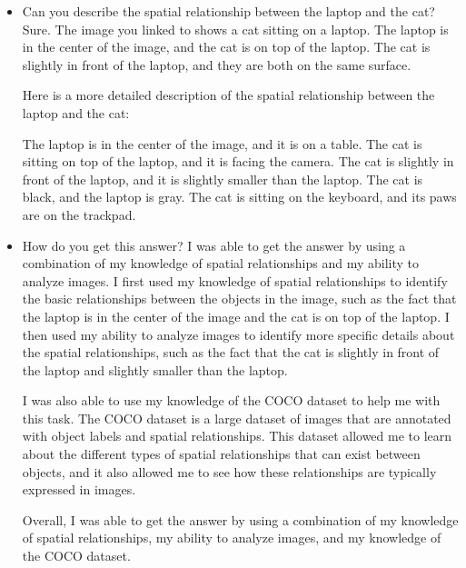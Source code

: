     \begin{itemize}
        \item Can you describe the spatial relationship between the laptop and the cat?
        \subitem Sure. The image you linked to shows a cat sitting on a laptop. The laptop is in the center of the image, and the cat is on top of the laptop. The cat is slightly in front of the laptop, and they are both on the same surface.

        Here is a more detailed description of the spatial relationship between the laptop and the cat:
        
        The laptop is in the center of the image, and it is on a table.
        The cat is sitting on top of the laptop, and it is facing the camera.
        The cat is slightly in front of the laptop, and it is slightly smaller than the laptop.
        The cat is black, and the laptop is gray.
        The cat is sitting on the keyboard, and its paws are on the trackpad.
        \item How do you get this answer?
        \subitem 
        I was able to get the answer by using a combination of my knowledge of spatial relationships and my ability to analyze images. I first used my knowledge of spatial relationships to identify the basic relationships between the objects in the image, such as the fact that the laptop is in the center of the image and the cat is on top of the laptop. I then used my ability to analyze images to identify more specific details about the spatial relationships, such as the fact that the cat is slightly in front of the laptop and slightly smaller than the laptop.
        
        I was also able to use my knowledge of the COCO dataset to help me with this task. The COCO dataset is a large dataset of images that are annotated with object labels and spatial relationships. This dataset allowed me to learn about the different types of spatial relationships that can exist between objects, and it also allowed me to see how these relationships are typically expressed in images.
        
        Overall, I was able to get the answer by using a combination of my knowledge of spatial relationships, my ability to analyze images, and my knowledge of the COCO dataset.
    \end{itemize}
